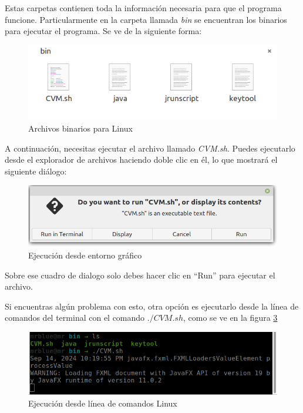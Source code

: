 \documentclass[letterpaper,12pt,oneside]{book}
\begin{document}
Estas carpetas contienen toda la información necesaria para que el programa funcione. Particularmente
en la carpeta llamada \textit{bin} se encuentran los binarios para ejecutar el programa. Se ve de la siguiente forma:


\begin{figure}[h]		
				\centering
				\includegraphics[scale=0.3]{media_g/linux_binary_files.png}
				\caption{Archivos binarios para Linux}
				\label{fig:github_binarylinuxfiles}
\end{figure}

A continuación, necesitas ejecutar el archivo llamado \textit{CVM.sh}. Puedes ejecutarlo desde el explorador de archivos haciendo doble clic en él, lo que mostrará el siguiente diálogo:


\begin{figure}[h]		
				\centering
				\includegraphics[scale=0.3]{media_g/executing_linux_file_twoclics.png}
				\caption{Ejecución desde entorno gráfico}
				\label{fig:github_graphiclinuxexecution}
\end{figure}


Sobre ese cuadro de dialogo solo debes hacer clic en ``Run'' para ejecutar el archivo.

Si encuentras algún problema con esto, otra opción es ejecutarlo desde la línea de comandos del terminal con el comando $./CVM.sh$,
como se ve en la figura \ref{fig:github_cmdlineexecution}

\begin{figure}[h]		
				\centering
				\includegraphics[scale=0.6]{media_g/linux_program_execution_tcl.png}
				\caption{Ejecución desde línea de comandos Linux}
				\label{fig:github_cmdlineexecution}
\end{figure}
\end{document}
